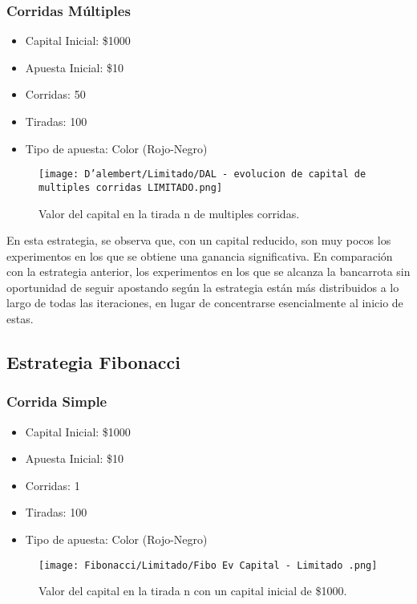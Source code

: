 \documentclass{article}
\begin{document}
\clearpage

\subsubsection{Corridas Múltiples}
\begin{itemize}[noitemsep]
\item Capital Inicial: \$1000
\item Apuesta Inicial: \$10
\item Corridas: 50
\item Tiradas: 100
\item Tipo de apuesta: Color (Rojo-Negro)
\end{itemize}
 \begin{figure} [h]
        \centering
            \texttt{[image: D'alembert/Limitado/DAL - evolucion de capital de multiples corridas LIMITADO.png]}
            \caption{Valor del capital en la tirada n de multiples corridas.}
            \label{fig:grafico}
    \end{figure}
    
En esta estrategia, se observa que, con un capital reducido, son muy pocos los experimentos en los que se obtiene una ganancia significativa. En comparación con la estrategia anterior, los experimentos en los que se alcanza la bancarrota sin oportunidad de seguir apostando según la estrategia están más distribuidos a lo largo de todas las iteraciones, en lugar de concentrarse esencialmente al inicio de estas.

\subsection{Estrategia Fibonacci}
\subsubsection{Corrida Simple}

\begin{itemize}[noitemsep]
\item Capital Inicial: \$1000
\item Apuesta Inicial: \$10
\item Corridas: 1
\item Tiradas: 100
\item Tipo de apuesta: Color (Rojo-Negro)
\end{itemize}

 \begin{figure} [H]
        \centering
             \texttt{[image: Fibonacci/Limitado/Fibo Ev Capital - Limitado .png]}
            \caption{Valor del capital en la tirada n con un capital inicial de \$1000.}
            \label{fig:grafico}
    \end{figure}
\end{document}
